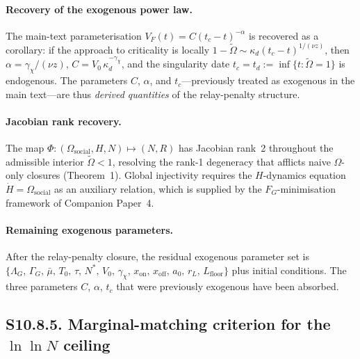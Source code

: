 \documentclass[11pt]{article}
\begin{document}
\paragraph{Recovery of the exogenous power law.}
The main-text parameterisation $V_F(t) = C(t_c-t)^{-\alpha}$ is recovered
as a corollary: if the approach to criticality is locally
$1-\tilde\Omega \sim \kappa_d(t_c-t)^{1/(\nu z)}$, then
$\alpha = \gamma_\chi/(\nu z)$, $C = V_0\,\kappa_d^{-\gamma_\chi}$, and
the singularity date $t_c = t_d := \inf\{t:\tilde\Omega=1\}$ is endogenous.
The parameters $C$, $\alpha$, and $t_c$---previously treated as exogenous
in the main text---are thus \emph{derived quantities} of the relay-penalty
structure.

\paragraph{Jacobian rank recovery.}
The map $\Phi:(\Omega_{\mathrm{social}},H,N)\mapsto(N,R)$ has Jacobian
rank~2 throughout the admissible interior $\tilde\Omega<1$, resolving the
rank-1 degeneracy that afflicts naive $\Omega$-only closures (Theorem~1).
Global injectivity requires the $H$-dynamics equation
$\dot H = \Omega_{\mathrm{social}}$ as an auxiliary relation, which is
supplied by the $F_G$-minimisation framework of Companion Paper~4.

\paragraph{Remaining exogenous parameters.}
After the relay-penalty closure, the residual exogenous parameter set is
$\{\Lambda_G,\,\Gamma_G,\,\bar\mu,\,T_0,\,\tau,\,N^*,\,V_0,\,\gamma_\chi,\,
x_{\mathrm{on}},\,x_{\mathrm{off}},\,a_0,\,r_L,\,L_{\mathrm{floor}}\}$
plus initial conditions. The three parameters $C$, $\alpha$, $t_c$ that were
previously exogenous have been absorbed.


\subsection*{S10.8.5. Marginal-matching criterion for the $\ln\!\ln N$ ceiling}
\label{sec:S10_8_5_marginal_matching}
\end{document}
